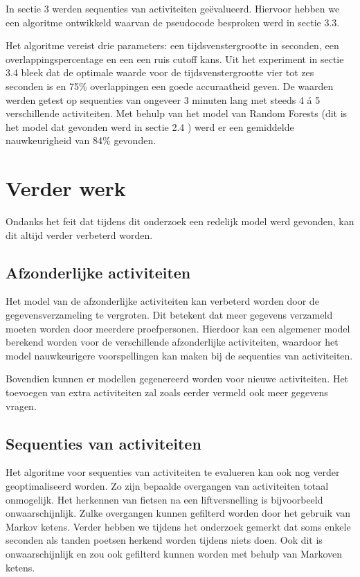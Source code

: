 \documentclass{article}
\begin{document}
	In sectie 3 werden sequenties van activiteiten ge\"evalueerd. Hiervoor hebben we een algoritme ontwikkeld waarvan de pseudocode besproken werd in sectie 3.3. 

Het algoritme vereist drie parameters: een tijdsvenstergrootte in seconden, een overlappingspercentage en een een ruis cutoff kans. Uit het experiment in sectie 3.4
bleek dat de optimale waarde voor de tijdsvenstergrootte vier tot zes seconden is en 75\% overlappingen een goede accuraatheid geven. De waarden werden getest op sequenties van ongeveer 3 minuten lang met steeds 4 \'a 5 verschillende activiteiten. Met behulp van het model van Random Forests (dit is het model dat gevonden werd in sectie 2.4
) werd er een gemiddelde nauwkeurigheid van 84\% gevonden.



\section{Verder werk}

Ondanks het feit dat tijdens dit onderzoek een redelijk model werd gevonden, kan dit altijd verder verbeterd worden.

\subsection{Afzonderlijke activiteiten}

Het model van de afzonderlijke activiteiten kan verbeterd worden door de gegevensverzameling te vergroten. Dit betekent dat meer gegevens verzameld moeten worden door meerdere proefpersonen. Hierdoor kan een algemener model berekend worden voor de verschillende afzonderlijke activiteiten, waardoor het model nauwkeurigere voorspellingen kan maken bij de sequenties van activiteiten.

Bovendien kunnen er modellen gegenereerd worden voor nieuwe activiteiten. Het toevoegen van extra activiteiten zal zoals eerder vermeld ook meer gegevens vragen.

\subsection{Sequenties van activiteiten}

Het algoritme voor sequenties van activiteiten te evalueren kan ook nog verder geoptimaliseerd worden. 
	Zo zijn bepaalde overgangen van activiteiten totaal onmogelijk. Het herkennen van fietsen na een liftversnelling is bijvoorbeeld onwaarschijnlijk. Zulke overgangen kunnen gefilterd worden door het gebruik van Markov ketens. Verder hebben we tijdens het onderzoek gemerkt dat soms enkele seconden als tanden poetsen herkend worden tijdens niets doen. Ook dit is onwaarschijnlijk en zou ook gefilterd kunnen worden met behulp van Markoven ketens.
\end{document}
